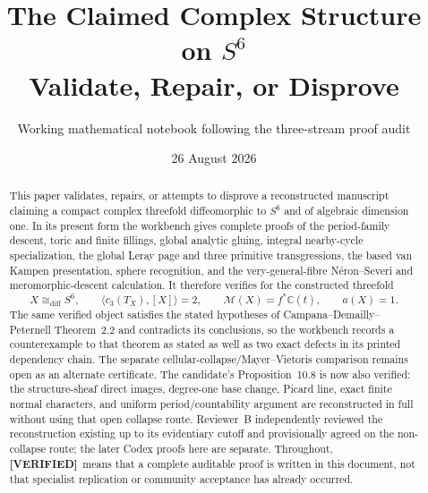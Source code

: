 \documentclass[11pt,letterpaper]{article}
\title{The Claimed Complex Structure on $S^6$\\
Validate, Repair, or Disprove}
\author{Working mathematical notebook following the three-stream proof audit}
\date{26 August 2026}
\newcommand{\Status}[2]{\textcolor{#1}{\textbf{[#2]}}}
\newcommand{\Verified}{\Status{Verified}{VERIFIED}}
\theoremstyle{definition}
\theoremstyle{remark}
\begin{document}
\maketitle

\begin{center}
\end{center}
\medskip

\begin{abstract}
This paper validates, repairs, or attempts to disprove a reconstructed
manuscript claiming a compact complex threefold diffeomorphic to $S^6$ and
of algebraic dimension one.  In its present form the workbench gives
complete proofs of the period-family descent, toric and finite fillings,
global analytic gluing, integral nearby-cycle specialization, the global
Leray page and three primitive transgressions, the based van Kampen
presentation, sphere recognition, and the very-general-fibre
N\'eron--Severi and meromorphic-descent calculation.  It therefore verifies
for the constructed threefold
\[
X\cong_{\mathrm{diff}}S^6,\qquad
\langle c_3(T_X),[X]\rangle=2,\qquad
\mathcal M(X)=f^*\mathbb C(t),\qquad a(X)=1.
\]
The same verified object satisfies the stated hypotheses of
Campana--Demailly--Peternell Theorem~2.2 and contradicts its conclusions, so
the workbench records a counterexample to that theorem as stated as well as
two exact defects in its printed dependency chain.  The separate
cellular-collapse/Mayer--Vietoris comparison remains open as an alternate
certificate.  The candidate's Proposition~10.8 is now also verified: the
structure-sheaf direct images, degree-one base change, Picard line, exact
finite normal characters, and uniform period/countability argument are
reconstructed in full without using that open collapse route.
Reviewer~B independently reviewed the reconstruction existing up to its
evidentiary cutoff and provisionally agreed on the non-collapse route; the
later Codex proofs here are separate.  Throughout, \Verified\ means that a
complete auditable proof is written in this document, not that specialist
replication or community acceptance has already occurred.
\end{abstract}

\tableofcontents















\end{document}
